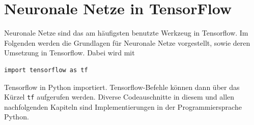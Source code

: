 \chapter{Neuronale Netze in TensorFlow}
Neuronale Netze sind das am h\"aufigsten benutzte Werkzeug in Tensorflow. Im Folgenden werden die Grundlagen f\"ur Neuronale Netze vorgestellt, sowie deren Umsetzung in Tensorflow. Dabei wird mit \cite{cookbook}
\vspace{0.3cm}
\begin{lstlisting}
import tensorflow as tf
\end{lstlisting} Tensorflow in Python importiert. Tensorflow-Befehle können dann über das Kürzel \lstinline$tf$ aufgerufen werden. Diverse Codeauschnitte in diesem und allen nachfolgenden Kapiteln sind Implementierungen in der Programmiersprache Python.



